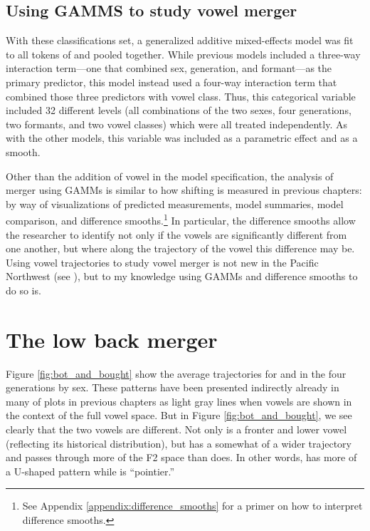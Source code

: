 \subsection{Using GAMMS to study vowel merger}

With these classifications set, a generalized additive mixed-effects model was fit to all tokens of \lot and \thought pooled together. While previous models included a three-way interaction term---one that combined sex, generation, and formant---as the primary predictor, this model instead used a four-way interaction term that combined those three predictors with vowel class. Thus, this categorical variable included 32 different levels (all combinations of the two sexes, four generations, two formants, and two vowel classes) which were all treated independently. As with the other models, this variable was included as a parametric effect and as a smooth.

Other than the addition of vowel in the model specification, the analysis of merger using GAMMs is similar to how shifting is measured in previous chapters: by way of visualizations of predicted measurements, model summaries, model comparison, and difference smooths.\footnote{See Appendix \ref{appendix:difference_smooths} for a primer on how to interpret difference smooths.} In particular, the difference smooths allow the researcher to identify not only if the vowels are significantly different from one another, but where along the trajectory of the vowel this difference may be. Using vowel trajectories to study vowel merger is not new in the Pacific Northwest (see \citealt{freeman_2014}), but to my knowledge using GAMMs and difference smooths to do so is.

\section{The low back merger}
\label{low_back_merger}

Figure \ref{fig:bot_and_bought} show the average trajectories for \lot and \thought in the four generations by sex. These patterns have been presented indirectly already in many of plots in previous chapters as light gray lines when vowels are shown in the context of the full vowel space. But in Figure \ref{fig:bot_and_bought}, we see clearly that the two vowels are different. Not only is \lot a fronter and lower vowel (reflecting its historical distribution), but \thought has a somewhat of a wider trajectory and passes through more of the F2 space than \lot does. In other words, \thought has more of a U-shaped pattern while \lot is ``pointier.''

